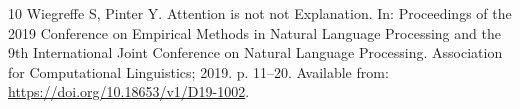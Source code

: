 \documentclass[pdflatex,sn-vancouver-num]{sn-jnl}
\theoremstyle{thmstyleone}
\begin{document}
\begin{thebibliography}{10}
Wiegreffe S, Pinter Y.
\newblock Attention is not not Explanation.
\newblock In: Proceedings of the 2019 Conference on Empirical Methods in
  Natural Language Processing and the 9th International Joint Conference on
  Natural Language Processing. Association for Computational Linguistics; 2019.
  p. 11--20.
\newblock Available from: \url{https://doi.org/10.18653/v1/D19-1002}.

\end{thebibliography}
\end{document}
